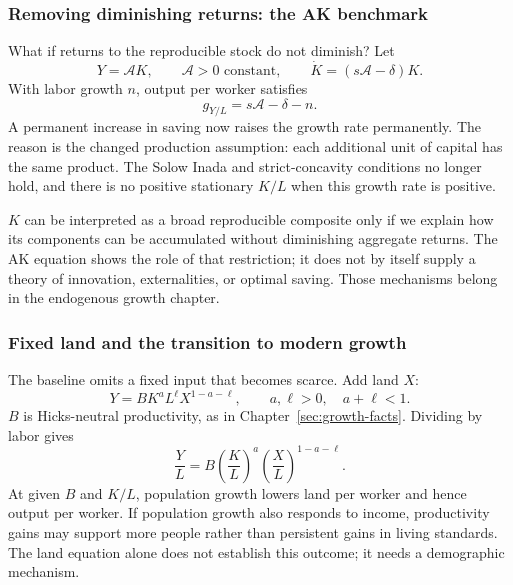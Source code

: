 \subsubsection{Removing diminishing returns: the AK benchmark}

What if returns to the reproducible stock do not diminish? Let
\begin{equation}
Y=\mathcal A K,\qquad \mathcal A>0\text{ constant},\qquad
\dot K=(s\mathcal A-\delta)K.
\end{equation}
With labor growth $n$, output per worker satisfies
\begin{equation}
g_{Y/L}=s\mathcal A-\delta-n.
\end{equation}
A permanent increase in saving now raises the growth rate permanently. The
reason is the changed production assumption: each additional unit of capital
has the same product. The Solow Inada and strict-concavity conditions no longer
hold, and there is no positive stationary $K/L$ when this growth rate is positive.

$K$ can be interpreted as a broad reproducible composite only if we explain
how its components can be accumulated without diminishing aggregate returns.
The AK equation shows the role of that restriction; it does not by itself
supply a theory of innovation, externalities, or optimal saving. Those
mechanisms belong in the endogenous growth chapter.

\subsubsection{Fixed land and the transition to modern growth}

The baseline omits a fixed input that becomes scarce. Add land $X$:
\begin{equation}
Y=BK^aL^\ell X^{1-a-\ell},\qquad
a,\ell>0,\quad a+\ell<1.
\end{equation}
$B$ is Hicks-neutral productivity, as in Chapter~\ref{sec:growth-facts}.
Dividing by labor gives
\begin{equation}
\frac{Y}{L}=B\left(\frac{K}{L}\right)^a
                 \left(\frac{X}{L}\right)^{1-a-\ell}.
\end{equation}
At given $B$ and $K/L$, population growth lowers land per worker and hence
output per worker. If population growth also responds to income, productivity
gains may support more people rather than persistent gains in living standards.
The land equation alone does not establish this outcome; it needs a demographic
mechanism.

